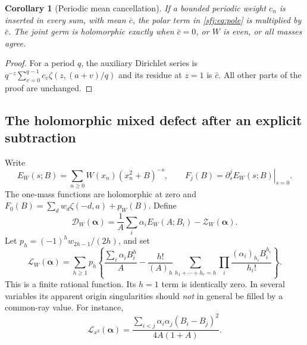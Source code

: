 \documentclass[11pt,letterpaper]{article}
\numberwithin{equation}{section}
\newtheorem{corollary}[theorem]{Corollary}
\theoremstyle{definition}
\theoremstyle{remark}
\begin{document}
\begin{corollary}[Periodic mean cancellation]
If a bounded periodic weight $c_n$ is inserted in every sum, with
mean $\bar c$, the polar term in \eqref{sfj:eq:pole} is multiplied
by $\bar c$.  The joint germ is holomorphic exactly when
$\bar c=0$, or $W$ is even, or all masses agree.
\end{corollary}
\begin{proof}
For a period $q$, the auxiliary Dirichlet series is
$q^{-z}\sum_{v=0}^{q-1}c_v\zeta(z,(a+v)/q)$ and its residue at
$z=1$ is $\bar c$.  All other parts of the proof are unchanged.
\end{proof}

\subsection{The holomorphic mixed defect after an explicit subtraction}

Write
\[
 E_W(s;B)=\sum_{n\ge0}W(x_n)(x_n^2+B)^{-s},\qquad
 F_j(B)=\left.\partial_s^jE_W(s;B)\right|_{s=0}.
\]
The one-mass functions are holomorphic at zero and
$F_0(B)=\sum_dw_d\zeta(-d,a)+p_W(B)$.  Define
\begin{equation}\label{sfj:eq:joint-defect}
 \mathscr D_W(\boldsymbol\alpha)
   =\frac1A\sum_i\alpha_iE_W(A;B_i)
                           -\mathscr Z_W(\boldsymbol\alpha).
\end{equation}
Let $p_h=(-1)^hw_{2h-1}/(2h)$, and set
\begin{equation}\label{sfj:eq:joint-local}
 \mathscr L_W(\boldsymbol\alpha)
  =\sum_{h\ge1}p_h\left\{
    \frac{\sum_i\alpha_iB_i^h}{A}
    -\frac{h!}{(A)_h}
       \sum_{h_1+\cdots+h_r=h}
          \prod_i\frac{(\alpha_i)_{h_i}B_i^{h_i}}{h_i!}
                         \right\}.
\end{equation}
This is a finite rational function.  Its $h=1$ term is identically
zero.  In several variables its apparent origin singularities should
\emph{not} in general be filled by a common-ray value.  For instance,
\begin{equation}\label{sfj:eq:joint-local-cubic}
 \mathscr L_{x^3}(\boldsymbol\alpha)
   =\frac{\sum_{i<j}\alpha_i\alpha_j(B_i-B_j)^2}{4A(1+A)}.
\end{equation}
\end{document}
